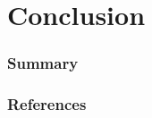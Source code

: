 \documentclass{beamer}
\begin{document}





\section{Conclusion}


\begin{frame}
    \frametitle{Summary}
\end{frame}

\begin{frame}[allowframebreaks]
    \frametitle{References}
    
\end{frame}
\end{document}
